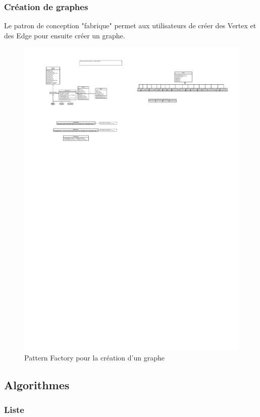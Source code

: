 \documentclass[french]{article}
\begin{document}
			\subsubsection{Création de graphes}
			Le patron de conception "fabrique" permet aux utilisateurs de créer des Vertex et des Edge pour ensuite créer un graphe.
			\begin{figure}[H]
				\centering
				\includegraphics[scale=2.8]{Conception/factory.pdf}
				\caption{Pattern Factory pour la création d'un graphe}
			\end{figure}
			
		
		\subsection{Algorithmes}
			\subsubsection{Liste}
\end{document}
